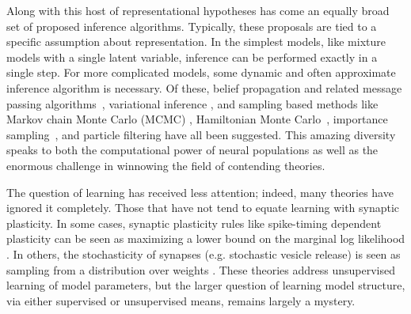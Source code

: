 Along with this host of representational hypotheses has come an
equally broad set of proposed inference algorithms. Typically, these
proposals are tied to a specific assumption about representation.  In
the simplest models, like mixture models with a single latent
variable, inference can be performed exactly in a single step.  For
more complicated models, some dynamic and often approximate inference 
algorithm is necessary. Of these, belief propagation and related
message passing algorithms~\cite{Rao2007, litvak2009cortical},
variational inference \cite{Friston2010, nessler2013bayesian},
and sampling based methods like Markov chain Monte Carlo (MCMC)
\cite{hoyer2003interpreting, Buesing2011, 
  Berkes2011, gershman2012multistability, legenstein2014ensembles},
Hamiltonian Monte Carlo~\cite{aitchison2014hamiltonian},
importance sampling~\cite{Shi2009}, 
and particle filtering \cite{lee2003hierarchical} have
all been suggested. This amazing diversity speaks to both the
computational power of neural populations as well as the
enormous challenge in winnowing the field of contending theories.

The question of learning has received less attention; indeed, many
theories have ignored it completely. Those that have not tend to
equate learning with synaptic plasticity. In some cases, synaptic
plasticity rules like spike-timing dependent plasticity can be seen as
maximizing a lower bound on the marginal log likelihood
\cite{Friston2010, nessler2013bayesian, rezende2011variational}. In
others, the stochasticity of synapses (e.g. stochastic vesicle
release) is seen as sampling from a distribution over weights
\cite{aitchison2015synaptic, kappel2015synaptic, kappel2015network, tully2014synaptic}.
These theories address unsupervised learning of model parameters, but
the larger question of learning model structure, via either supervised
or unsupervised means, remains largely a mystery.


